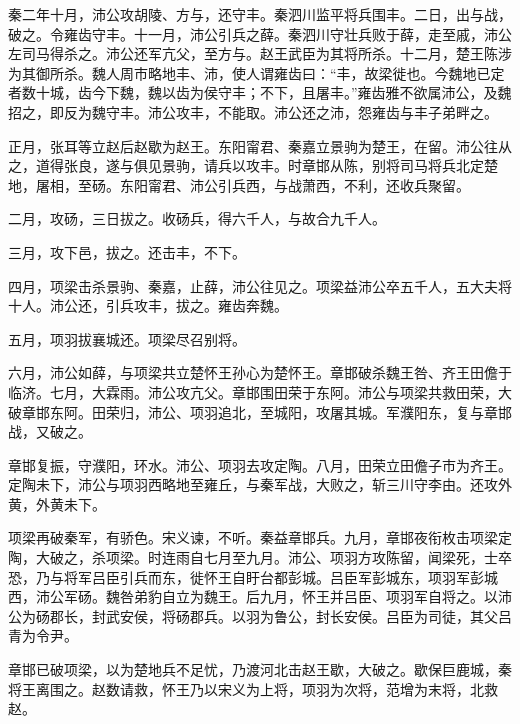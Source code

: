 \documentclass[12pt,UTF8]{ctexbook}
\begin{document}
秦二年十月，沛公攻胡陵、方与，还守丰。秦泗川监平将兵围丰。二日，出与战，破之。令雍齿守丰。十一月，沛公引兵之薛。秦泗川守壮兵败于薛，走至戚，沛公左司马得杀之。沛公还军亢父，至方与。赵王武臣为其将所杀。十二月，楚王陈涉为其御所杀。魏人周市略地丰、沛，使人谓雍齿曰：“丰，故梁徙也。今魏地已定者数十城，齿今下魏，魏以齿为侯守丰；不下，且屠丰。”雍齿雅不欲属沛公，及魏招之，即反为魏守丰。沛公攻丰，不能取。沛公还之沛，怨雍齿与丰子弟畔之。



正月，张耳等立赵后赵歇为赵王。东阳甯君、秦嘉立景驹为楚王，在留。沛公往从之，道得张良，遂与俱见景驹，请兵以攻丰。时章邯从陈，别将司马将兵北定楚地，屠相，至砀。东阳甯君、沛公引兵西，与战萧西，不利，还收兵聚留。



二月，攻砀，三日拔之。收砀兵，得六千人，与故合九千人。



三月，攻下邑，拔之。还击丰，不下。



四月，项梁击杀景驹、秦嘉，止薛，沛公往见之。项梁益沛公卒五千人，五大夫将十人。沛公还，引兵攻丰，拔之。雍齿奔魏。



五月，项羽拔襄城还。项梁尽召别将。



六月，沛公如薛，与项梁共立楚怀王孙心为楚怀王。章邯破杀魏王咎、齐王田儋于临济。七月，大霖雨。沛公攻亢父。章邯围田荣于东阿。沛公与项梁共救田荣，大破章邯东阿。田荣归，沛公、项羽追北，至城阳，攻屠其城。军濮阳东，复与章邯战，又破之。



章邯复振，守濮阳，环水。沛公、项羽去攻定陶。八月，田荣立田儋子市为齐王。定陶未下，沛公与项羽西略地至雍丘，与秦军战，大败之，斩三川守李由。还攻外黄，外黄未下。



项梁再破秦军，有骄色。宋义谏，不听。秦益章邯兵。九月，章邯夜衔枚击项梁定陶，大破之，杀项梁。时连雨自七月至九月。沛公、项羽方攻陈留，闻梁死，士卒恐，乃与将军吕臣引兵而东，徙怀王自盱台都彭城。吕臣军彭城东，项羽军彭城西，沛公军砀。魏咎弟豹自立为魏王。后九月，怀王并吕臣、项羽军自将之。以沛公为砀郡长，封武安侯，将砀郡兵。以羽为鲁公，封长安侯。吕臣为司徒，其父吕青为令尹。



章邯已破项梁，以为楚地兵不足忧，乃渡河北击赵王歇，大破之。歇保巨鹿城，秦将王离围之。赵数请救，怀王乃以宋义为上将，项羽为次将，范增为末将，北救赵。
\end{document}
